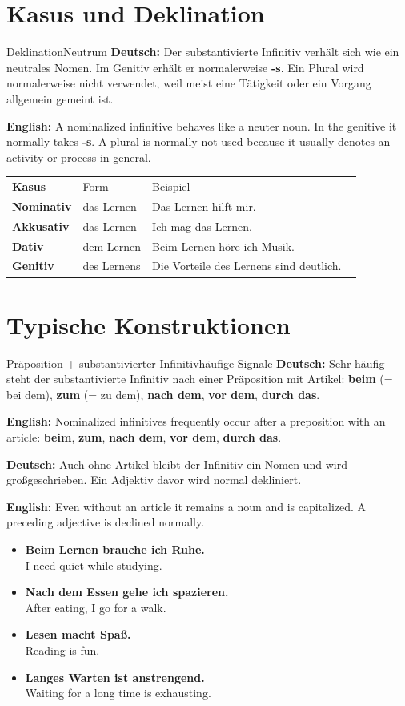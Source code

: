 \documentclass[a4paper,11pt]{article}
\newcommand{\GermanText}[1]{\textbf{Deutsch: }#1\par}
\newcommand{\EnglishText}[1]{{\small\color{SoftGray}\textbf{English: }#1\par}}
\newcommand{\ExampleItem}[2]{\item \textbf{#1}\\{\small\color{SoftGray}#2}}
\begin{document}
\begin{preview}
\section{Kasus und Deklination}
\begin{grammarentry}{Deklination}{Neutrum}
\GermanText{Der substantivierte Infinitiv verhält sich wie ein neutrales Nomen. Im Genitiv erhält er normalerweise \textbf{-s}. Ein Plural wird normalerweise nicht verwendet, weil meist eine Tätigkeit oder ein Vorgang allgemein gemeint ist.}
\EnglishText{A nominalized infinitive behaves like a neuter noun. In the genitive it normally takes \textbf{-s}. A plural is normally not used because it usually denotes an activity or process in general.}
\end{grammarentry}
\begin{longtable}{>{\bfseries}p{2.8cm}|p{3.5cm}|p{7.5cm}}
\rowcolor{HeaderBlueDark}\color{white}Kasus & \color{white}Form & \color{white}Beispiel \\
Nominativ & das Lernen & Das Lernen hilft mir. \\
Akkusativ & das Lernen & Ich mag das Lernen. \\
Dativ & dem Lernen & Beim Lernen höre ich Musik. \\
Genitiv & des Lernens & Die Vorteile des Lernens sind deutlich. \
\end{longtable}

\section{Typische Konstruktionen}
\begin{grammarentry}{Präposition + substantivierter Infinitiv}{häufige Signale}
\GermanText{Sehr häufig steht der substantivierte Infinitiv nach einer Präposition mit Artikel: \textbf{beim} (= bei dem), \textbf{zum} (= zu dem), \textbf{nach dem}, \textbf{vor dem}, \textbf{durch das}.}
\EnglishText{Nominalized infinitives frequently occur after a preposition with an article: \textbf{beim}, \textbf{zum}, \textbf{nach dem}, \textbf{vor dem}, \textbf{durch das}.}
\GermanText{Auch ohne Artikel bleibt der Infinitiv ein Nomen und wird großgeschrieben. Ein Adjektiv davor wird normal dekliniert.}
\EnglishText{Even without an article it remains a noun and is capitalized. A preceding adjective is declined normally.}
\end{grammarentry}
\begin{exbox}\begin{itemize}
\ExampleItem{Beim Lernen brauche ich Ruhe.}{I need quiet while studying.}
\ExampleItem{Nach dem Essen gehe ich spazieren.}{After eating, I go for a walk.}
\ExampleItem{Lesen macht Spaß.}{Reading is fun.}
\ExampleItem{Langes Warten ist anstrengend.}{Waiting for a long time is exhausting.}
\end{itemize}\end{exbox}


\end{preview}
\end{document}
